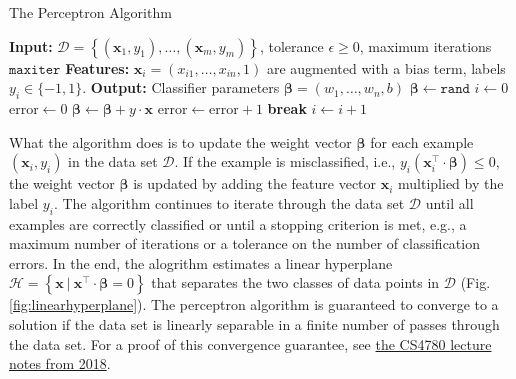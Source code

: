 \documentclass{article}[11pt]
\begin{document}
\begin{algorithm}[H]
    \caption{The Perceptron Algorithm}\label{alg:perceptron}
    \begin{algorithmic}[1]
        \State \textbf{Input:} $\mathcal{D} = \left\{(\mathbf{x}_{1},y_{1}),\dotsc,(\mathbf{x}_{m},y_{m})\right\}$, tolerance $\epsilon\geq{0}$, maximum iterations $\texttt{maxiter}$
        \State \textbf{Features:} $\mathbf{x}_{i} = \left(x_{i1},\dots, x_{in},1\right)$ are augmented with a bias term, labels $y_{i}\in\{-1,1\}$.
        \State \textbf{Output:} Classifier parameters $\mathbf{\beta} = \left(w_{1},\dots, w_{n}, b\right)$
        \State $\mathbf{\beta} \gets \texttt{rand}$
        \State $i \gets 0$
        \State $\text{error} \gets 0$
                \State $\mathbf{\beta} \gets \mathbf{\beta} + {y}\cdot\mathbf{x}$
                \State $\text{error} \gets \text{error} + 1$
            \EndIf
        \EndFor
            \State \textbf{break}     
        \EndIf
        \State $i \gets i + 1$
        \EndWhile
    \end{algorithmic}
\end{algorithm}
What the algorithm does is to update the weight vector $\mathbf{\beta}$ for each example $(\mathbf{x}_{i},y_{i})$ in the data set $\mathcal{D}$.
If the example is misclassified, i.e., $y_{i}\left(\mathbf{x}_{i}^{\top}\cdot\mathbf{\beta}\right)\leq{0}$, the weight vector $\mathbf{\beta}$ is updated by adding the feature vector $\mathbf{x}_{i}$ multiplied by the label $y_{i}$.
The algorithm continues to iterate through the data set $\mathcal{D}$ until all examples are correctly classified or until a stopping criterion is met, e.g., a maximum number of iterations or a tolerance on the number of classification errors.
In the end, the alogrithm estimates a linear hyperplane $\mathcal{H} = \left\{\mathbf{x}~|~\mathbf{x}^{\top}\cdot\mathbf{\beta} = 0\right\}$ that separates the two classes of data points in $\mathcal{D}$ (Fig. \ref{fig:linearhyperplane}).
The perceptron algorithm is guaranteed to converge to a solution if the data set is linearly separable in a finite number of passes through the data set.
For a proof of this convergence guarantee, see \href{https://www.cs.cornell.edu/courses/cs4780/2018fa/lectures/lecturenote03.html}{the CS4780 lecture notes from 2018}.
\end{document}
